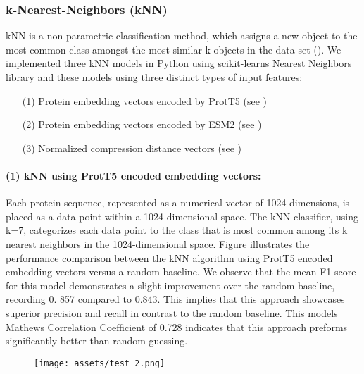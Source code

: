 \documentclass{bioinfo}
\begin{document}
\subsubsection{k-Nearest-Neighbors (kNN)}
kNN is a non-parametric classification method,
which assigns a new object to the most common class amongst the most similar k objects in the data set (\cite{knn_principles}). We implemented three kNN models in Python using scikit-learns Nearest Neighbors library and 
these models using three distinct types of input features:
\begin{enumerate}
	\item[(1)] Protein embedding vectors encoded by ProtT5 (see \cite{ProtT5})
    \item[(2)] Protein embedding vectors encoded by ESM2 (see \cite{ESM2})
    \item[(3)] Normalized compression distance vectors (see \cite{GzipTextClassification})
\end{enumerate}


\paragraph{(1) kNN using ProtT5 encoded embedding vectors:}

Each protein sequence, represented as a numerical vector of 1024 dimensions, is placed as a data 
point within a 1024-dimensional space. The kNN classifier, using k=7,
categorizes each data point to the class that is most common among its k nearest neighbors in the 1024-dimensional space.
Figure 
illustrates the performance comparison between the kNN algorithm using ProtT5 encoded embedding vectors versus a random baseline. 
We observe that the mean F1 score for this model demonstrates a slight improvement over the random baseline,
recording 0. 857 compared to 0.843. This implies that this approach showcases superior precision and recall in contrast to the random baseline.
This models Mathews Correlation Coefficient of 0.728 indicates that this approach preforms significantly better than random guessing.

\begin{figure}[!htpb]
\texttt{[image: assets/test\_2.png]}
\end{figure}
\end{document}
